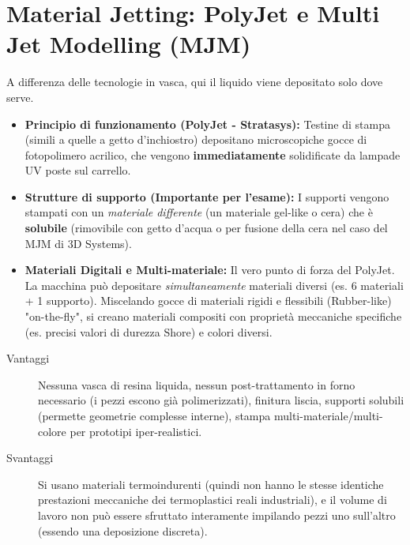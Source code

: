 \section{Material Jetting: PolyJet e Multi Jet Modelling (MJM)}
A differenza delle tecnologie in vasca, qui il liquido viene depositato solo dove serve.
\begin{itemize}
    \item \textbf{Principio di funzionamento (PolyJet - Stratasys):} Testine di stampa (simili a quelle a getto d'inchiostro) depositano microscopiche gocce di fotopolimero acrilico, che vengono \textbf{immediatamente} solidificate da lampade UV poste sul carrello.
    \item \textbf{Strutture di supporto (Importante per l'esame):} I supporti vengono stampati con un \textit{materiale differente} (un materiale gel-like o cera) che è \textbf{solubile} (rimovibile con getto d'acqua o per fusione della cera nel caso del MJM di 3D Systems).
    \item \textbf{Materiali Digitali e Multi-materiale:} Il vero punto di forza del PolyJet. La macchina può depositare \textit{simultaneamente} materiali diversi (es. 6 materiali + 1 supporto). Miscelando gocce di materiali rigidi e flessibili (Rubber-like) "on-the-fly", si creano materiali compositi con proprietà meccaniche specifiche (es. precisi valori di durezza Shore) e colori diversi.
\end{itemize}
\begin{description}
    \item [Vantaggi] Nessuna vasca di resina liquida, nessun post-trattamento in forno necessario (i pezzi escono già polimerizzati), finitura liscia, supporti solubili (permette geometrie complesse interne), stampa multi-materiale/multi-colore per prototipi iper-realistici.
    \item [Svantaggi] Si usano materiali termoindurenti (quindi non hanno le stesse identiche prestazioni meccaniche dei termoplastici reali industriali), e il volume di lavoro non può essere sfruttato interamente impilando pezzi uno sull'altro (essendo una deposizione discreta).
\end{description}